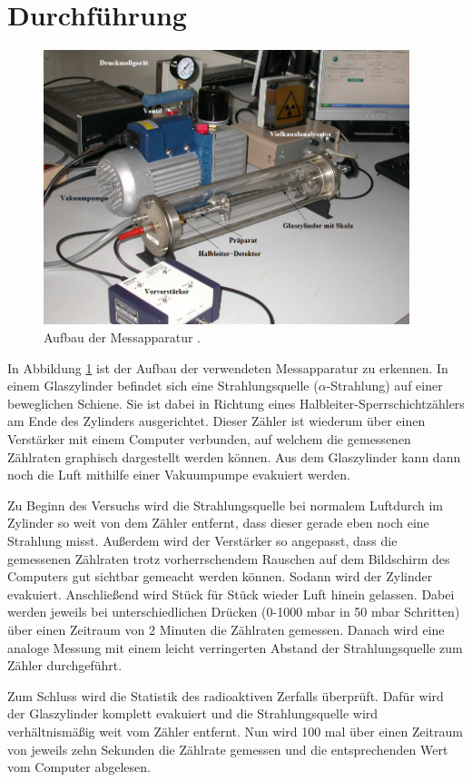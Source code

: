\section{Durchführung}
\label{sec:Durchführung}

\begin{figure}[H]
  \centering
  \includegraphics[height=8cm]{Aufbau.PNG}
  \caption{Aufbau der Messapparatur \cite{sample}.}
  \label{fig:aufbau}
\end{figure}

In Abbildung \ref{fig:aufbau} ist der Aufbau der verwendeten Messapparatur zu erkennen.
In einem Glaszylinder befindet sich eine Strahlungsquelle ($\alpha$-Strahlung) auf einer
beweglichen Schiene. Sie ist dabei in Richtung eines Halbleiter-Sperrschichtzählers am Ende
des Zylinders ausgerichtet. Dieser Zähler ist wiederum über einen Verstärker mit einem
Computer verbunden, auf welchem die gemessenen Zählraten graphisch dargestellt werden können.
Aus dem Glaszylinder kann dann noch die Luft mithilfe einer Vakuumpumpe evakuiert werden.

Zu Beginn des Versuchs wird die Strahlungsquelle bei normalem Luftdurch im Zylinder so weit
von dem Zähler entfernt, dass dieser gerade eben noch eine Strahlung misst. Außerdem wird
der Verstärker so angepasst, dass die gemessenen Zählraten trotz vorherrschendem Rauschen auf
dem Bildschirm des Computers gut sichtbar gemeacht werden können. Sodann wird
der Zylinder evakuiert. Anschließend wird Stück für Stück wieder Luft hinein gelassen.
Dabei werden jeweils bei unterschiedlichen Drücken (0-1000 mbar in 50 mbar Schritten)
über einen Zeitraum von 2 Minuten die Zählraten gemessen.
Danach wird eine analoge Messung mit einem leicht verringerten Abstand der Strahlungsquelle
zum Zähler durchgeführt.

Zum Schluss wird die Statistik des radioaktiven Zerfalls überprüft. Dafür wird der
Glaszylinder komplett evakuiert und die Strahlungsquelle wird verhältnismäßig weit vom
Zähler entfernt. Nun wird 100 mal über einen Zeitraum von jeweils zehn Sekunden die
Zählrate gemessen und die entsprechenden Wert vom Computer abgelesen.
